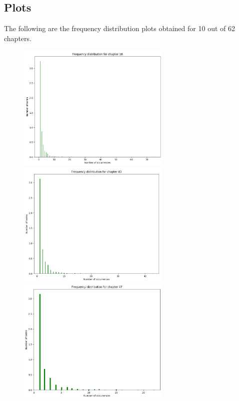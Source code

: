 \documentclass{article}
\begin{document}
\subsection{Plots}
\begin{flushleft}
The following are the frequency distribution plots obtained for 10 out of 62 chapters. 
\begin{figure}[H]
\begin{minipage}{0.42\linewidth}
\centering
\includegraphics[width=0.65\textwidth]{./images/1-chapter_wise-frequency.png}
\includegraphics[width=0.65\textwidth]{./images/2-chapter_wise-frequency.png}
\includegraphics[width=0.65\textwidth]{./images/3-chapter_wise-frequency.png}

\end{minipage}
\end{figure}
\end{flushleft}
\end{document}
